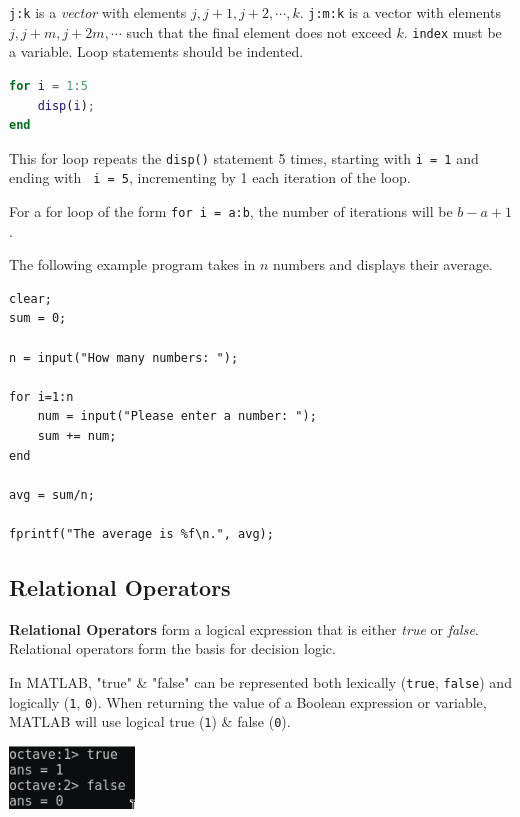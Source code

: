 \documentclass[11pt]{article}
\begin{document}
\verb|j:k| is a \textit{vector} with elements $j, j+1, j+2, \cdots, k$. 
\verb|j:m:k| is a vector with elements $j, j+m, j+2m, \cdots$ such that the final element does not exceed $k$. 
\verb|index| must be a variable. Loop statements should be indented.


\begin{lstlisting}[language=MATLAB]
for i = 1:5
    disp(i);
end
\end{lstlisting}

This for loop repeats the \verb|disp()| statement 5 times, starting with \verb|i = 1| and ending with \verb| i = 5|, incrementing by 1 each iteration of the loop. 

For a for loop of the form \verb|for i = a:b|, the number of iterations will be $b - a +1$.

The following example program takes in $n$ numbers and displays their average. 
\begin{lstlisting}
clear; 
sum = 0;

n = input("How many numbers: ");

for i=1:n 
    num = input("Please enter a number: ");
    sum += num;
end 

avg = sum/n; 

fprintf("The average is %f\n.", avg); 
\end{lstlisting}


\subsection{Relational Operators} 
\textbf{Relational Operators} form a logical expression that is either \textit{true} or \textit{false}.
Relational operators form the basis for decision logic. 

In MATLAB, "true" \& "false" can be represented both lexically (\verb|true|, \verb|false|) and logically (\verb|1|, \verb|0|). 
When returning the value of a Boolean expression or variable, MATLAB will use logical true (\verb|1|) \& false (\verb|0|). 

\begin{center}
    \includegraphics[width=0.25\textwidth]{truefalse.png}
\end{center}
\end{document}
